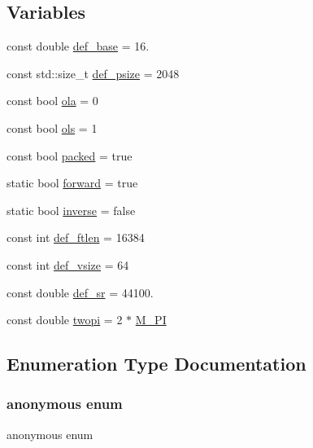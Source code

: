 \subsection*{Variables}
\begin{DoxyCompactItemize}
\item 
const double \hyperlink{namespace_aurora_acb267dff62f74484893c2d5b679b78bf}{def\+\_\+base} = 16.
\item 
const std\+::size\+\_\+t \hyperlink{namespace_aurora_a080d03c33477d9c6322278722ca8e472}{def\+\_\+psize} = 2048
\item 
const bool \hyperlink{namespace_aurora_ab2cb0b1f6952bb2ca908ebd8156370db}{ola} = 0
\item 
const bool \hyperlink{namespace_aurora_a4e816792565225ccd6ba67110f75fb8b}{ols} = 1
\item 
const bool \hyperlink{namespace_aurora_a3e70ffc9ea5c526dcd66b1b14e43f175}{packed} = true
\item 
static bool \hyperlink{namespace_aurora_a20b1bd3f1b34b8676e26d07718dac352}{forward} = true
\item 
static bool \hyperlink{namespace_aurora_ac22c4e2e10572cbb6f64f3bd1cd595b5}{inverse} = false
\item 
const int \hyperlink{namespace_aurora_a14dabfd9feedfa09c0e6f86d2627f006}{def\+\_\+ftlen} = 16384
\item 
const int \hyperlink{namespace_aurora_afaaddf667a06e7ce23c667a8b7295263}{def\+\_\+vsize} = 64
\item 
const double \hyperlink{namespace_aurora_ad49263d809bea98dd422e95bc91bc03e}{def\+\_\+sr} = 44100.
\item 
const double \hyperlink{namespace_aurora_a4c08f8416c2b35d5001062f121459b5a}{twopi} = 2 $\ast$ \hyperlink{_snd_base_8h_ae71449b1cc6e6250b91f539153a7a0d3}{M\+\_\+\+PI}
\end{DoxyCompactItemize}


\subsection{Enumeration Type Documentation}
\mbox{\label{namespace_aurora_a890b8d3786c8a25750e8097adae3b513}} 
\subsubsection{\texorpdfstring{anonymous enum}{anonymous enum}}
{\footnotesize\ttfamily anonymous enum}

